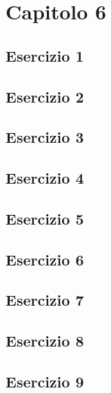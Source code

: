 \documentclass[a4paper,12pt,oneside]{book}
\begin{document}
\hypertarget{capitolo-6}{%
\section{Capitolo 6}\label{capitolo-6}}

\hypertarget{esercizio-1-4}{%
\subsection{Esercizio 1}\label{esercizio-1-4}}

\hypertarget{esercizio-2-4}{%
\subsection{Esercizio 2}\label{esercizio-2-4}}

\hypertarget{esercizio-3-3}{%
\subsection{Esercizio 3}\label{esercizio-3-3}}

\hypertarget{esercizio-4-2}{%
\subsection{Esercizio 4}\label{esercizio-4-2}}

\hypertarget{esercizio-5-2}{%
\subsection{Esercizio 5}\label{esercizio-5-2}}

\hypertarget{esercizio-6-1}{%
\subsection{Esercizio 6}\label{esercizio-6-1}}

\hypertarget{esercizio-7-1}{%
\subsection{Esercizio 7}\label{esercizio-7-1}}

\hypertarget{esercizio-8-1}{%
\subsection{Esercizio 8}\label{esercizio-8-1}}

\hypertarget{esercizio-9}{%
\subsection{Esercizio 9}\label{esercizio-9}}
\end{document}
